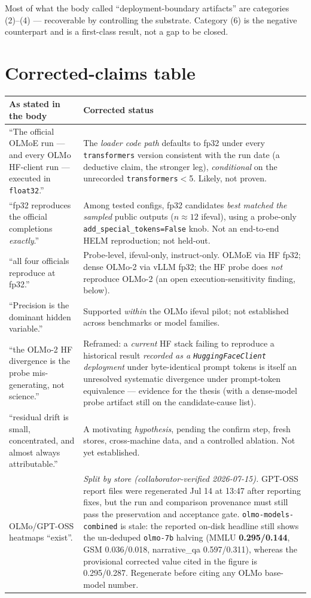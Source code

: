 \documentclass[11pt]{report}
\newcommand{\code}[1]{\texttt{#1}}
\begin{document}
Most of what the body called ``deployment-boundary artifacts'' are categories
(2)--(4) --- recoverable by controlling the substrate. Category (6) is the negative
counterpart and is a first-class result, not a gap to be closed.

\section{Corrected-claims table}

\begin{longtable}{@{}p{}p{}@{}}
\toprule
\textbf{As stated in the body} & \textbf{Corrected status} \\
\midrule
\endhead
``The official OLMoE run --- and every OLMo HF-client run --- executed in
\code{float32}.'' & The \emph{loader code path} defaults to fp32 under every
\code{transformers} version consistent with the run date (a deductive claim, the
stronger leg), \emph{conditional} on the unrecorded \code{transformers}$<$5. Likely,
not proven. \\
``fp32 reproduces the official completions \emph{exactly}.'' & Among tested configs,
fp32 candidates \emph{best matched the sampled} public outputs ($n\approx12$ ifeval),
using a probe-only \code{add\_special\_tokens=False} knob. Not an end-to-end HELM
reproduction; not held-out. \\
``all four officials reproduce at fp32.'' & Probe-level, ifeval-only, instruct-only.
OLMoE via HF fp32; dense OLMo-2 via vLLM fp32; the HF probe does \emph{not} reproduce
OLMo-2 (an open execution-sensitivity finding, below). \\
``Precision is the dominant hidden variable.'' & Supported \emph{within} the OLMo
ifeval pilot; not established across benchmarks or model families. \\
``the OLMo-2 HF divergence is the probe mis-generating, not science.'' & Reframed: a
\emph{current} HF stack failing to reproduce a historical result \emph{recorded as a
\code{HuggingFaceClient} deployment} under byte-identical prompt tokens is itself an
unresolved systematic divergence under prompt-token equivalence --- evidence for the
thesis (with a dense-model probe artifact still on the candidate-cause list). \\
``residual drift is small, concentrated, and almost always attributable.'' & A
motivating \emph{hypothesis}, pending the confirm step, fresh stores, cross-machine
data, and a controlled ablation. Not yet established. \\
OLMo/GPT-OSS heatmaps ``exist''. & \emph{Split by store (collaborator-verified
2026-07-15).} GPT-OSS report files were regenerated Jul 14 at 13:47 after reporting
fixes, but the run and comparison provenance must still pass the preservation and
acceptance gate. \code{olmo-models-combined} is stale: the reported on-disk headline
still shows the un-deduped \code{olmo-7b} halving (MMLU \textbf{0.295/0.144}, GSM
0.036/0.018, narrative\_qa 0.597/0.311), whereas the provisional corrected value cited
in the figure is 0.295/0.287. Regenerate before citing any OLMo base-model number. \\
\bottomrule
\end{longtable}
\end{document}
